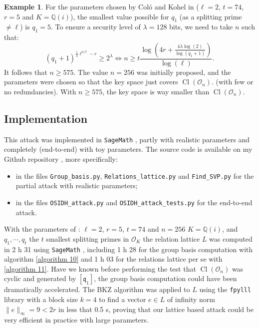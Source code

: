 \documentclass[a4paper,10pt]{report}
\theoremstyle{definition}
\theoremstyle{plain}
\theoremstyle{definition}
\newtheorem{Example}[Definition]{Example}
\newcommand{\Q}{\mathbb{Q}}
\newcommand{\mO}{\mathcal{O}}
\renewcommand{\(}{\left(}
\renewcommand{\)}{\right)}
\newcommand{\mf}[1]{\mathfrak{#1}}
\DeclareMathOperator{\Cl}{Cl}
\begin{document}
\begin{Example}
For the parameters chosen by Col\'{o} and Kohel in \cite[section 6]{OSIDH} ($\ell=2$, $t=74$, $r=5$ and $K=\Q(i)$), the smallest value possible for $q_1$ (as a splitting prime $\neq \ell$) is $q_1=5$. To ensure a security level of $\lambda=128$ bits,  we need to take $n$ such that:
\[(q_1+1)^{\frac{1}{4}\ell^{n/t}-r}\geq 2^\lambda \Longleftrightarrow n\geq t\frac{\log\(4r+\frac{4\lambda\log(2)}{\log(q_1+1)}\)}{\log(\ell)}.\]
It follows that $n\geq 575$. The value $n=256$ was initially proposed, and the parameters were chosen so that the key space just covers $\Cl(\mO_n)$. (with few or no redundancies). With $n\geq 575$, the key space is way smaller than $\Cl(\mO_n)$.
\end{Example}

\subsection{Implementation}\label{paragraph 17}

This attack was implemented in \verb?SageMath? \cite{sagemath}, partly with realistic parameters and completely (end-to-end) with toy parameters. The source code is available on my Github repository \cite{MyGithub}, more specifically:
\begin{itemize}
\item  in the files \verb?Group_basis.py?, \verb?Relations_lattice.py? and \verb?Find_SVP.py? for the partial attack with realistic parameters;
\item in the files \verb?OSIDH_attack.py? and \verb?OSIDH_attack_tests.py? for the end-to-end attack.
\end{itemize}

With the parameters of \cite[p. 28]{OSIDH}: $\ell=2$, $r=5$, $t=74$ and $n=256$ $K=\Q(i)$,  and $q_1,\cdots, q_t$ the $t$ smallest splitting primes in $\mO_K$ the relation lattice $L$ was computed in 2 h 31 using \verb?SageMath? \cite{sagemath}, including 1 h 28 for the group basis computation with algorithm \ref{algorithm 10} and 1 h 03 for the relations lattice per se with \ref{algorithm 11}. Have we known before performing the test that $\Cl(\mO_n)$ was cyclic and generated by $[\mf{q}_1]$, the group basis computation could have been dramatically accelerated. The BKZ algorithm \cite{BKZ} was applied to $L$ using the \verb?fpylll? library \cite{fpylll} with a block size $k=4$ to find a vector $e\in L$ of infinity norm $\|e\|_\infty=9<2r$ in less that 0.5 s, proving that our lattice based attack could be very efficient in practice with large parameters.
\end{document}
